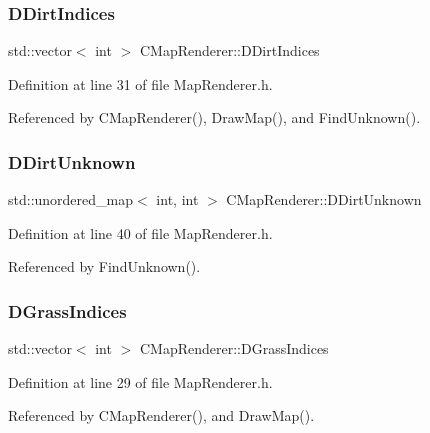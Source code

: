 \subsubsection{\texorpdfstring{D\+Dirt\+Indices}{DDirtIndices}}
{\footnotesize\ttfamily std\+::vector$<$ int $>$ C\+Map\+Renderer\+::\+D\+Dirt\+Indices\hspace{0.3cm}{\ttfamily [protected]}}



Definition at line 31 of file Map\+Renderer.\+h.



Referenced by C\+Map\+Renderer(), Draw\+Map(), and Find\+Unknown().

\hypertarget{classCMapRenderer_ab899664d372da1c8e4b5802c9e720173}{}\label{classCMapRenderer_ab899664d372da1c8e4b5802c9e720173} 
\subsubsection{\texorpdfstring{D\+Dirt\+Unknown}{DDirtUnknown}}
{\footnotesize\ttfamily std\+::unordered\+\_\+map$<$ int, int $>$ C\+Map\+Renderer\+::\+D\+Dirt\+Unknown\hspace{0.3cm}{\ttfamily [protected]}}



Definition at line 40 of file Map\+Renderer.\+h.



Referenced by Find\+Unknown().

\hypertarget{classCMapRenderer_abea42ed77fce8a53ef0cfd6c82a5d676}{}\label{classCMapRenderer_abea42ed77fce8a53ef0cfd6c82a5d676} 
\subsubsection{\texorpdfstring{D\+Grass\+Indices}{DGrassIndices}}
{\footnotesize\ttfamily std\+::vector$<$ int $>$ C\+Map\+Renderer\+::\+D\+Grass\+Indices\hspace{0.3cm}{\ttfamily [protected]}}



Definition at line 29 of file Map\+Renderer.\+h.



Referenced by C\+Map\+Renderer(), and Draw\+Map().

